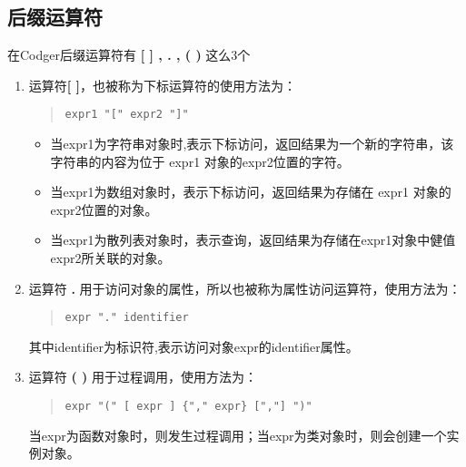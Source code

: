 \subsection{后缀运算符}
在Codger后缀运算符有\textbf{ [ ] , . , ( ) } 这么3个
\begin{enumerate}
\item 运算符\textbf{[ ]}，也被称为下标运算符的使用方法为：
\begin{quote}
\begin{verbatim}
expr1 "[" expr2 "]"
\end{verbatim}
\end{quote}
\begin{itemize}
\item 当expr1为字符串对象时,表示下标访问，返回结果为一个新的字符串，该字符串的内容为位于 expr1 对象的expr2位置的字符。
\item 当expr1为数组对象时，表示下标访问，返回结果为存储在 expr1 对象的expr2位置的对象。
\item 当expr1为散列表对象时，表示查询，返回结果为存储在expr1对象中健值expr2所关联的对象。
\end{itemize}
\item 运算符 \textbf{ . } 用于访问对象的属性，所以也被称为属性访问运算符，使用方法为：
\begin{quote}
\begin{verbatim}
expr "." identifier 
\end{verbatim}
\end{quote}
其中identifier为标识符,表示访问对象expr的identifier属性。
\item 运算符 \textbf{ ( ) } 用于过程调用，使用方法为：
\begin{quote}
\begin{verbatim}
expr "(" [ expr ] {"," expr} [","] ")"
\end{verbatim}
\end{quote}
当expr为函数对象时，则发生过程调用；当expr为类对象时，则会创建一个实例对象。
\end{enumerate}
